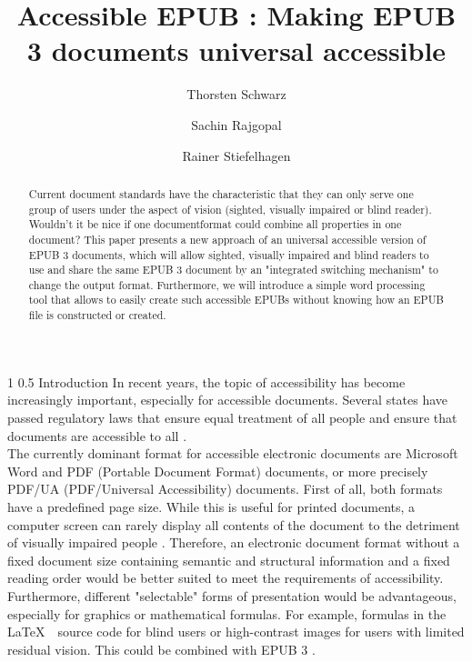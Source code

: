 \documentclass[12pt]{llncs}
\title{Accessible EPUB : Making EPUB 3 documents universal accessible}
\author{Thorsten Schwarz \and Sachin Rajgopal \and Rainer Stiefelhagen}
\institute{Karlsruhe Institute of Technology, Studycentre for the Visually Impaired, Engesserstr. 4, 76131 Karlsruhe, Germany\\
\email{thorsten.schwarz@kit.edu},\\ WWW home page:
\texttt{http://szs.kit.edu}
}
\makeatletter
\renewcommand\section{\@startsection 
   {section}{1}{0mm}%
   {1\baselineskip}%
   {0.5\baselineskip}%
   {\bfseries\Large}%
   }
\makeatother
\begin{document}
\maketitle

\begin{abstract}
Current document standards have the characteristic that they can only serve one group of users under the aspect of vision (sighted, visually impaired or blind reader). Wouldn't it be nice if one documentformat could combine all properties in one document? 
This paper presents a new approach of an universal accessible version of EPUB 3 documents, which will allow sighted, visually impaired and blind readers to use and share the same EPUB 3 document by an "integrated switching mechanism" to change the output format. Furthermore, we will introduce a simple word processing tool that allows to easily create such accessible EPUBs without knowing how an EPUB file is constructed or created. 
\end{abstract}

\section{Introduction}
In recent years, the topic of accessibility has become increasingly important, especially for accessible documents. Several states have passed regulatory laws that ensure equal treatment of all people and ensure that documents are accessible to all \cite{webaim}.\\
The currently dominant format for accessible electronic documents are Microsoft Word and PDF (Portable Document Format) documents, or more precisely PDF/UA (PDF/Universal Accessibility) documents. First of all, both formats have a predefined page size. While this is useful for printed documents, a computer screen can rarely display all contents of the document to the detriment of visually impaired people \cite{EPUBzone}. Therefore, an electronic document format without a fixed document size containing semantic and structural information and a fixed reading order would be better suited to meet the requirements of accessibility.\\
Furthermore, different "selectable" forms of presentation would be advantageous, especially for graphics or mathematical formulas. For example, formulas in the \LaTeX $\mbox{ }$ source code for blind users or high-contrast images for users with limited residual vision. This could be combined with EPUB 3 \cite{EPUBzone}.
\end{document}
